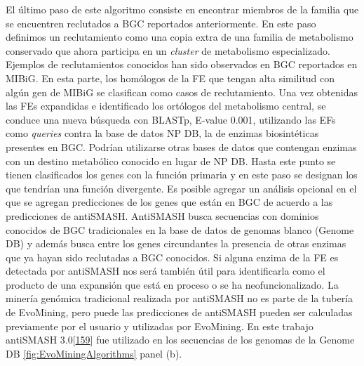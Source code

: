 \documentclass[12pt,twoside]{reedthesis}
\begin{document}
  El último paso de este algoritmo consiste en encontrar miembros de la
  familia que se encuentren reclutados a BGC reportados anteriormente. En
  este paso definimos un reclutamiento como una copia extra de una familia
  de metabolismo conservado que ahora participa en un \emph{cluster} de
  metabolismo especializado. Ejemplos de reclutamientos conocidos han sido
  observados en BGC reportados en MIBiG. En esta parte, los homólogos de
  la FE que tengan alta similitud con algún gen de MIBiG se clasifican
  como casos de reclutamiento. Una vez obtenidas las FEs expandidas e
  identificado los ortólogos del metabolismo central, se conduce una nueva
  búsqueda con BLASTp, E-value 0.001, utilizando las EFs como
  \emph{queries} contra la base de datos NP DB, la de enzimas
  biosintéticas presentes en BGC. Podrían utilizarse otras bases de datos
  que contengan enzimas con un destino metabólico conocido en lugar de NP
  DB. Hasta este punto se tienen clasificados los genes con la función
  primaria y en este paso se designan los que tendrían una función
  divergente. Es posible agregar un análisis opcional en el que se agregan
  predicciones de los genes que están en BGC de acuerdo a las predicciones
  de antiSMASH. AntiSMASH busca secuencias con dominios conocidos de BGC
  tradicionales en la base de datos de genomas blanco (Genome DB) y además
  busca entre los genes circundantes la presencia de otras enzimas que ya
  hayan sido reclutadas a BGC conocidos. Si alguna enzima de la FE es
  detectada por antiSMASH nos será también útil para identificarla como el
  producto de una expansión que está en proceso o se ha neofuncionalizado.
  La minería genómica tradicional realizada por antiSMASH no es parte de
  la tubería de EvoMining, pero puede las predicciones de antiSMASH pueden
  ser calculadas previamente por el usuario y utilizadas por EvoMining. En
  este trabajo antiSMASH
  3.0{[}\protect\hyperlink{ref-weber_antismash3_2015}{159}{]} fue
  utilizado en los secuencias de los genomas de la Genome DB
  \autoref{fig:EvoMiningAlgorithms} panel (b).
  
\end{document}
